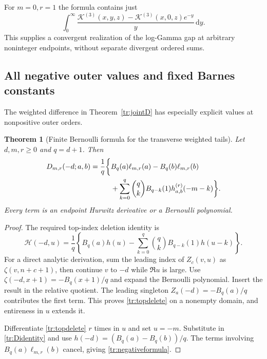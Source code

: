 \documentclass[11pt,letterpaper]{article}
\numberwithin{equation}{section}
\theoremstyle{plain}
\newtheorem{theorem}{Theorem}[section]
\theoremstyle{definition}
\theoremstyle{remark}
\newcommand{\dd}{\,\mathrm d}
\newcommand{\HH}{\mathcal H}
\begin{document}
For $m=0,r=1$ the formula contains just
\[
 \int_0^\infty
 \frac{\mathscr K^{(3)}(x,y,z)-\mathscr K^{(3)}(x,0,z)e^{-y}}y\dd y.
\]
This supplies a convergent realization of the log-Gamma gap at arbitrary
noninteger endpoints, without separate divergent ordered sums.

\subsection{All negative outer values and fixed Barnes constants}

The weighted difference in Theorem~\ref{tr:jointD} has especially
explicit values at nonpositive outer orders.

\begin{theorem}[Finite Bernoulli formula for the transverse weighted tails]
\label{tr:negativeD}
Let $d,m,r\geq0$ and $q=d+1$. Then
\begin{align}
 D_{m,r}(-d;a,b)
   =\frac1q\biggl\{&
        B_q(a)\ell_{m,r}(a)-B_q(b)\ell_{m,r}(b)\notag\\
       &+\sum_{k=0}^q\binom qk B_{q-k}(1)
                             h_{a,b}^{(r)}(-m-k)\biggr\}.
 \label{tr:negativeformula}
\end{align}
Every term is an endpoint Hurwitz derivative or a Bernoulli polynomial.
\end{theorem}

\begin{proof}
The required top-index deletion identity is
\begin{equation}\label{tr:topdelete}
 \HH(-d,u)=\frac1q\left\{
 B_q(a)h(u)-\sum_{k=0}^q\binom qk B_{q-k}(1)h(u-k)\right\}.
\end{equation}
For a direct analytic derivation, sum the leading index of $Z_c(v,u)$
as $\zeta(v,n+c+1)$, then continue $v$ to $-d$ while $\Re u$ is
large. Use
$\zeta(-d,x+1)=-B_q(x+1)/q$ and expand the Bernoulli polynomial.
Insert the result in the relative quotient. The leading singleton
$Z_a(-d)=-B_q(a)/q$ contributes the first term. This proves
\eqref{tr:topdelete} on a nonempty domain, and entireness in $u$ extends it.

Differentiate \eqref{tr:topdelete} $r$ times in $u$ and set $u=-m$.
Substitute in \eqref{tr:Didentity} and use
$h(-d)=(B_q(a)-B_q(b))/q$. The terms involving
$B_q(a)\ell_{m,r}(b)$ cancel, giving \eqref{tr:negativeformula}.
\end{proof}
\end{document}
